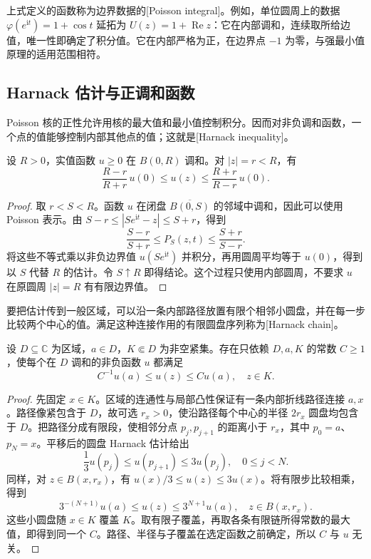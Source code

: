 上式定义的函数称为边界数据的[Poisson integral]。例如，单位圆周上的数据 \(\varphi(e^{\mathrm i t})=1+\cos t\) 延拓为 \(U(z)=1+\operatorname{Re}z\)：它在内部调和，连续取所给边值，唯一性即确定了积分值。它在内部严格为正，在边界点 \(-1\) 为零，与强最小值原理的适用范围相符。

\subsection{Harnack 估计与正调和函数}
\label{b3:subsec:150104}

Poisson 核的正性允许用核的最大值和最小值控制积分。因而对非负调和函数，一个点的值能够控制内部其他点的值；这就是[Harnack inequality]。

\begin{theorem}[Harnack]\label{b3:thm:15-harnack}
设 \(R>0\)，实值函数 \(u\ge0\) 在 \(B(0,R)\) 调和。对 \(|z|=r<R\)，有
\[
 \frac{R-r}{R+r}\,u(0)\le u(z)
 \le\frac{R+r}{R-r}\,u(0).
\]
\end{theorem}
\begin{proof}
取 \(r<S<R\)。函数 \(u\) 在闭盘 \(\overline{B(0,S)}\) 的邻域中调和，因此可以使用 Poisson 表示。由
\(S-r\le|Se^{\mathrm i t}-z|\le S+r\)，得到
\[
 \frac{S-r}{S+r}\le P_S(z,t)\le\frac{S+r}{S-r}.
\]
将这些不等式乘以非负边界值 \(u(Se^{\mathrm i t})\) 并积分，再用圆周平均等于 \(u(0)\)，得到以 \(S\) 代替 \(R\) 的估计。令 \(S\uparrow R\) 即得结论。这个过程只使用内部圆周，不要求 \(u\) 在原圆周 \(|z|=R\) 有有限边界值。
\end{proof}

要把估计传到一般区域，可以沿一条内部路径放置有限个相邻小圆盘，并在每一步比较两个中心的值。满足这种连接作用的有限圆盘序列称为[Harnack chain]。

\begin{proposition}\label{b3:prop:15-harnack-chain}
设 \(D\subseteq\mathbb C\) 为区域，\(a\in D\)，\(K\Subset D\) 为非空紧集。存在只依赖 \(D,a,K\) 的常数 \(C\ge1\)，使每个在 \(D\) 调和的非负函数 \(u\) 都满足
\[
 C^{-1}u(a)\le u(z)\le Cu(a),
 \quad z\in K.
\]
\end{proposition}
\begin{proof}
先固定 \(x\in K\)。区域的连通性与局部凸性保证有一条内部折线路径连接 \(a,x\)。路径像紧包含于 \(D\)，故可选 \(r_x>0\)，使沿路径每个中心的半径 \(2r_x\) 圆盘均包含于 \(D\)。把路径分成有限段，使相邻分点 \(p_j,p_{j+1}\) 的距离小于 \(r_x\)，其中 \(p_0=a\)、\(p_N=x\)。平移后的圆盘 Harnack 估计给出
\[
 \frac13u(p_j)\le u(p_{j+1})\le3u(p_j),
 \quad 0\le j<N.
\]
同样，对 \(z\in B(x,r_x)\)，有 \(u(x)/3\le u(z)\le3u(x)\)。将有限步比较相乘，得到
\[
 3^{-(N+1)}u(a)\le u(z)\le3^{N+1}u(a),
 \quad z\in B(x,r_x).
\]
这些小圆盘随 \(x\in K\) 覆盖 \(K\)。取有限子覆盖，再取各条有限链所得常数的最大值，即得到同一个 \(C\)。路径、半径与子覆盖在选定函数之前确定，所以 \(C\) 与 \(u\) 无关。
\end{proof}


